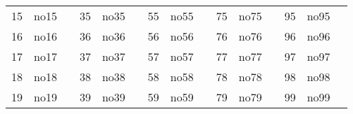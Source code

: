 \documentclass[12pt]{article}
\begin{document}
\begin{table}[]
\begin{tabular}{lllllllllllllll}
\multicolumn{1}{|l|}{15} & 
\multicolumn{1}{l|}{no15}        & 
\multicolumn{1}{l|}{} & 
\multicolumn{1}{l|}{35} & 
\multicolumn{1}{l|}{no35}        & 
\multicolumn{1}{l|}{} & 
\multicolumn{1}{l|}{55} & 
\multicolumn{1}{l|}{no55}        & 
\multicolumn{1}{l|}{} & 
\multicolumn{1}{l|}{75} & 
\multicolumn{1}{l|}{no75}        & 
\multicolumn{1}{l|}{} & 
\multicolumn{1}{l|}{95}  & 
\multicolumn{1}{l|}{no95}        &  \\ \cline{1-2} \cline{4-5} \cline{7-8} \cline{10-11} \cline{13-14}



\multicolumn{1}{|l|}{16} & 
\multicolumn{1}{l|}{no16}        & 
\multicolumn{1}{l|}{} & 
\multicolumn{1}{l|}{36} & 
\multicolumn{1}{l|}{no36}        & 
\multicolumn{1}{l|}{} & 
\multicolumn{1}{l|}{56} & 
\multicolumn{1}{l|}{no56}        & 
\multicolumn{1}{l|}{} & 
\multicolumn{1}{l|}{76} & 
\multicolumn{1}{l|}{no76}        & 
\multicolumn{1}{l|}{} & 
\multicolumn{1}{l|}{96}  & 
\multicolumn{1}{l|}{no96}        &  \\ \cline{1-2} \cline{4-5} \cline{7-8} \cline{10-11} \cline{13-14}



\multicolumn{1}{|l|}{17} & 
\multicolumn{1}{l|}{no17}        & 
\multicolumn{1}{l|}{} & 
\multicolumn{1}{l|}{37} & 
\multicolumn{1}{l|}{no37}        & 
\multicolumn{1}{l|}{} & 
\multicolumn{1}{l|}{57} & 
\multicolumn{1}{l|}{no57}        & 
\multicolumn{1}{l|}{} & 
\multicolumn{1}{l|}{77} & 
\multicolumn{1}{l|}{no77}        & 
\multicolumn{1}{l|}{} & 
\multicolumn{1}{l|}{97}  & 
\multicolumn{1}{l|}{no97}        &  \\ \cline{1-2} \cline{4-5} \cline{7-8} \cline{10-11} \cline{13-14}



\multicolumn{1}{|l|}{18} & 
\multicolumn{1}{l|}{no18}        & 
\multicolumn{1}{l|}{} & 
\multicolumn{1}{l|}{38} & 
\multicolumn{1}{l|}{no38}        & 
\multicolumn{1}{l|}{} & 
\multicolumn{1}{l|}{58} & 
\multicolumn{1}{l|}{no58}        & 
\multicolumn{1}{l|}{} & 
\multicolumn{1}{l|}{78} & 
\multicolumn{1}{l|}{no78}        & 
\multicolumn{1}{l|}{} & 
\multicolumn{1}{l|}{98}  & 
\multicolumn{1}{l|}{no98}        &  \\ \cline{1-2} \cline{4-5} \cline{7-8} \cline{10-11} \cline{13-14}



\multicolumn{1}{|l|}{19} & 
\multicolumn{1}{l|}{no19}        & 
\multicolumn{1}{l|}{} & 
\multicolumn{1}{l|}{39} & 
\multicolumn{1}{l|}{no39}        & 
\multicolumn{1}{l|}{} & 
\multicolumn{1}{l|}{59} & 
\multicolumn{1}{l|}{no59}        & 
\multicolumn{1}{l|}{} & 
\multicolumn{1}{l|}{79} & 
\multicolumn{1}{l|}{no79}        & 
\multicolumn{1}{l|}{} & 
\multicolumn{1}{l|}{99}  & 
\multicolumn{1}{l|}{no99}        &  \\ \cline{1-2} \cline{4-5} \cline{7-8} \cline{10-11} \cline{13-14}




\end{tabular}
\end{table}
\end{document}
